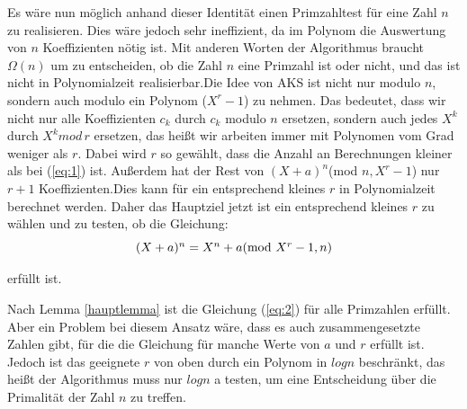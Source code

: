 \documentclass[12pt,oneside]{article}
\theoremstyle{remark}
\theoremstyle{definition}
\begin{document}
\begin{flushleft}
Es wäre nun möglich anhand dieser Identität einen Primzahltest für eine Zahl $n$ zu realisieren. Dies wäre jedoch sehr ineffizient, da im Polynom die Auswertung von $n$ Koeffizienten nötig ist. Mit anderen Worten der Algorithmus braucht $\Omega(n)$ um zu entscheiden, ob die Zahl $n$ eine Primzahl ist oder nicht, und das ist nicht in Polynomialzeit realisierbar.\newline\newline Die Idee von AKS ist nicht nur modulo $n$, sondern auch modulo ein Polynom ($X^r -1$) zu nehmen. Das bedeutet, dass wir nicht nur alle Koeffizienten $c_{k}$ durch $c_{k}$ modulo $n$ ersetzen, sondern auch jedes $X^k$ durch $X^k mod \, r$ ersetzen, das heißt wir arbeiten immer mit Polynomen vom Grad weniger als $r$. Dabei wird $r$ so gewählt, dass die Anzahl an Berechnungen kleiner als bei (\ref{eq:1}) ist. Außerdem hat der Rest von $(X + a)^n$(mod $ n, X^r - 1$) nur $ r + 1$ Koeffizienten.\newline Dies kann für ein entsprechend kleines $r$ in Polynomialzeit berechnet werden. Daher das Hauptziel jetzt ist ein entsprechend kleines $r$ zu wählen und zu testen, ob die Gleichung:\newline\newline
\begin{equation}\label{eq:2}
    \centerline{$(X + a)^n = X^n + a $(mod $X^r - 1, n$)}
\end{equation}

erfüllt ist.\newline

Nach Lemma \ref{hauptlemma} ist die Gleichung (\ref{eq:2}) für alle Primzahlen erfüllt. Aber ein Problem bei diesem Ansatz wäre, dass es auch zusammengesetzte Zahlen gibt, für die die Gleichung für manche Werte von $a$ und $r$ erfüllt ist. Jedoch ist das geeignete $r$ von oben durch ein Polynom in $log n$ beschränkt, das heißt der Algorithmus muss nur $log n$ a testen, um eine Entscheidung über die Primalität der Zahl $n$ zu treffen.

\end{flushleft}
\end{document}
